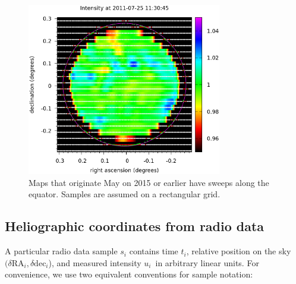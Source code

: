 \documentclass{aa}
\begin{document}
\begin{figure}
\centering
\includegraphics[width=8.5cm]{nea1311582408.png}
\caption{Maps that originate May on 2015 or earlier have sweeps along the equator. Samples are assumed on a rectangular grid.}
\label{oldmap}
\end{figure}

\subsection{Heliographic coordinates from radio data}

A particular radio data sample $s_i$ contains time $t_i$, relative position on the sky $(\delta \mathrm{RA}_i, \delta 
\mathrm{dec}_i$), and measured intensity $u_i$ in arbitrary linear units. For convenience, we use two equivalent 
conventions for sample notation:
\end{document}
